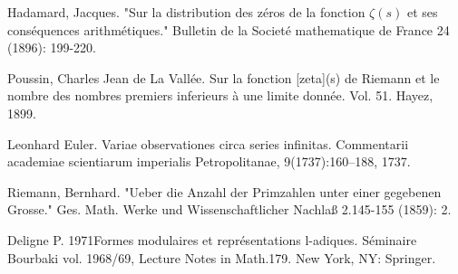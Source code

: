 \documentclass[12pt,reqno]{amsart}
\theoremstyle{definition}
\numberwithin{equation}{section}
\begin{document}
\begin{thebibliography}{99}
    Hadamard, Jacques. "Sur la distribution des zéros de la fonction $\zeta (s) $ et ses conséquences arithmétiques." Bulletin de la Societé mathematique de France 24 (1896): 199-220.

    Poussin, Charles Jean de La Vallée. Sur la fonction [zeta](s) de Riemann et le nombre des nombres premiers inferieurs à une limite donnée. Vol. 51. Hayez, 1899.

    Leonhard Euler. Variae observationes circa series infinitas. Commentarii academiae scientiarum
    imperialis Petropolitanae, 9(1737):160–188, 1737.

    Riemann, Bernhard. "Ueber die Anzahl der Primzahlen unter einer gegebenen Grosse." Ges. Math. Werke und Wissenschaftlicher Nachlaß 2.145-155 (1859): 2.

    Deligne P. 1971Formes modulaires et représentations l-adiques. Séminaire Bourbaki vol. 1968/69, Lecture Notes in Math.179. New York, NY: Springer.
\end{thebibliography}
\end{document}
